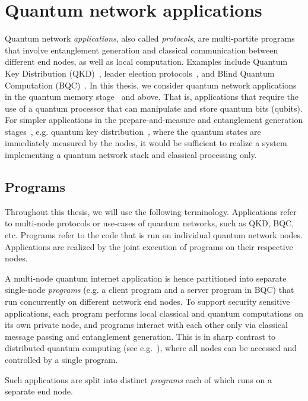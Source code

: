 \section{Quantum network applications}
Quantum network \textit{applications}, also called \textit{protocols}, are multi-partite programs that involve entanglement generation and classical communication between different end nodes, as well as local computation.
Examples include Quantum Key Distribution (QKD)~\cite{bb84, ekert1991quantum}, leader election protocols~\cite{kobayashi2014simpler, ganz2009quantum}, and Blind Quantum Computation (BQC)~\cite{Wehner2018stages}.
In this thesis, we consider quantum network applications in the quantum memory stage~\cite{wehner_2018_stages} and above. That is, applications that require the use of a quantum processor that can manipulate and store quantum bits (qubits). For simpler applications in the prepare-and-measure and entanglement generation stages~\cite{wehner_2018_stages}, e.g. quantum key distribution~\cite{bb84Original,ekert_1991_e91}, where the quantum states are immediately measured by the nodes, it would be sufficient to realize a system implementing a quantum network stack and classical processing only.

\subsection{Programs}
Throughout this thesis, we will use the following terminology.
Applications refer to multi-node protocols or use-cases of quantum networks, such as QKD, BQC, etc.
Programs refer to the code that is run on individual quantum network nodes.
Applications are realized by the joint execution of programs on their respective nodes.

A multi-node quantum internet application is hence partitioned into separate single-node \textit{programs} (e.g. a client program and a server program in BQC) that run concurrently on different network end nodes.
To support security sensitive applications, each program performs local classical and quantum computations on its own private node, and programs interact with each other only via classical message passing and entanglement generation.
This is in sharp contrast to distributed quantum computing (see e.g.~\cite{cacciapuoti2019quantum}), where all nodes can be accessed and controlled by a single program. 


Such applications are split into distinct \textit{programs} each of which runs on a separate end node.


